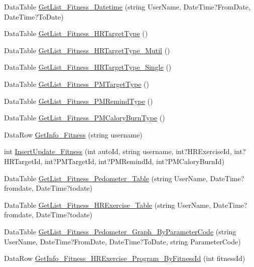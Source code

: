 \begin{DoxyCompactItemize}
Data\-Table \hyperlink{class_d_b_class_afe95c3d2857408582667370a34a4d88f}{Get\-List\-\_\-\-Fitness\-\_\-\-Datetime} (string User\-Name, Date\-Time?From\-Date, Date\-Time?To\-Date)
\item 
Data\-Table \hyperlink{class_d_b_class_a71298419ee709564e5c3074993c8e6d7}{Get\-List\-\_\-\-Fitness\-\_\-\-H\-R\-Target\-Type} ()
\item 
Data\-Table \hyperlink{class_d_b_class_a11af85d867a3a0c6c6a0e58d7cdeb5f8}{Get\-List\-\_\-\-Fitness\-\_\-\-H\-R\-Target\-Type\-\_\-\-Mutil} ()
\item 
Data\-Table \hyperlink{class_d_b_class_accf3ec92d4f585456ec3ff188e680fd3}{Get\-List\-\_\-\-Fitness\-\_\-\-H\-R\-Target\-Type\-\_\-\-Single} ()
\item 
Data\-Table \hyperlink{class_d_b_class_aee30d253f34099e058adde2106c19e4f}{Get\-List\-\_\-\-Fitness\-\_\-\-P\-M\-Target\-Type} ()
\item 
Data\-Table \hyperlink{class_d_b_class_a6814ee4c5e499dee4dca88ecb8f931e3}{Get\-List\-\_\-\-Fitness\-\_\-\-P\-M\-Remind\-Type} ()
\item 
Data\-Table \hyperlink{class_d_b_class_a82ded31f7b4ff63404618f1f668f4002}{Get\-List\-\_\-\-Fitness\-\_\-\-P\-M\-Calory\-Burn\-Type} ()
\item 
Data\-Row \hyperlink{class_d_b_class_ab7a630ce1c5e96d2a3430824a326299a}{Get\-Info\-\_\-\-Fitness} (string username)
\item 
int \hyperlink{class_d_b_class_a2d9bfec6c5e881fe884b8ad900368e49}{Insert\-Update\-\_\-\-Fitness} (int auto\-Id, string username, int?H\-R\-Exercise\-Id, int?H\-R\-Target\-Id, int?P\-M\-Target\-Id, int?P\-M\-Remind\-Id, int?P\-M\-Calory\-Burn\-Id)
\item 
Data\-Table \hyperlink{class_d_b_class_aca185474fc9923019ac4b4998d7212f5}{Get\-List\-\_\-\-Fitness\-\_\-\-Pedometer\-\_\-\-Table} (string User\-Name, Date\-Time?fromdate, Date\-Time?todate)
\item 
Data\-Table \hyperlink{class_d_b_class_a6b96de68a2a33aaa4438da7100c376c3}{Get\-List\-\_\-\-Fitness\-\_\-\-H\-R\-Exercise\-\_\-\-Table} (string User\-Name, Date\-Time?fromdate, Date\-Time?todate)
\item 
Data\-Table \hyperlink{class_d_b_class_a83af91ca1c0b7b98c951d8c70287218b}{Get\-List\-\_\-\-Fitness\-\_\-\-Pedometer\-\_\-\-Graph\-\_\-\-By\-Parameter\-Code} (string User\-Name, Date\-Time?From\-Date, Date\-Time?To\-Date, string Parameter\-Code)
\item 
Data\-Row \hyperlink{class_d_b_class_a7f44358ae70f852c5318bab2673d86ef}{Get\-Info\-\_\-\-Fitness\-\_\-\-H\-R\-Exercise\-\_\-\-Program\-\_\-\-By\-Fitness\-Id} (int fitness\-Id)

\end{DoxyCompactItemize}
